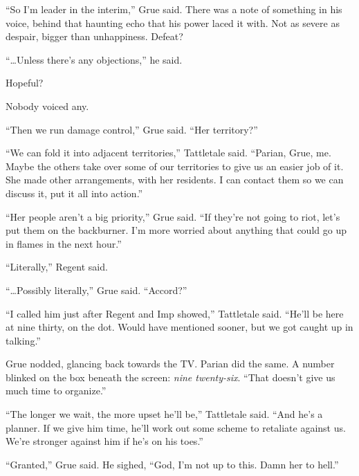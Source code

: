 ``So I'm leader in the interim,'' Grue said.  There was a note of something in his voice, behind that haunting echo that his power laced it with.  Not as severe as despair, bigger than unhappiness.  Defeat?



``\ldots{}Unless there's any objections,'' he said.



Hopeful?



Nobody voiced any.



``Then we run damage control,'' Grue said.  ``Her territory?''



``We can fold it into adjacent territories,'' Tattletale said.  ``Parian, Grue, me.  Maybe the others take over some of our territories to give us an easier job of it.  She made other arrangements, with her residents.  I can contact them so we can discuss it, put it all into action.''



``Her people aren't a big priority,'' Grue said.  ``If they're not going to riot, let's put them on the backburner.  I'm more worried about anything that could go up in flames in the next hour.''



``Literally,'' Regent said.



``\ldots{}Possibly literally,'' Grue said.  ``Accord?''



``I called him just after Regent and Imp showed,'' Tattletale said.  ``He'll be here at nine thirty, on the dot.  Would have mentioned sooner, but we got caught up in talking.''



Grue nodded, glancing back towards the TV.  Parian did the same.  A number blinked on the box beneath the screen: \emph{nine twenty-six}.  ``That doesn't give us much time to organize.''



``The longer we wait, the more upset he'll be,'' Tattletale said.  ``And he's a planner.  If we give him time, he'll work out some scheme to retaliate against us.  We're stronger against him if he's on his toes.''



``Granted,'' Grue said.  He sighed, ``God, I'm not up to this.  Damn her to hell.''



